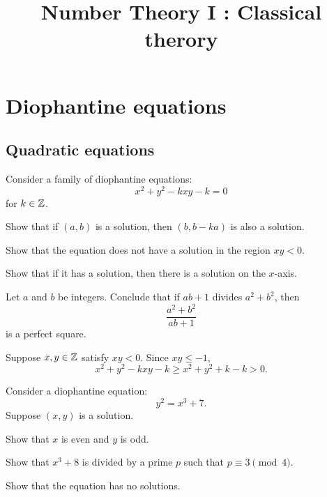 \documentclass{../prb}
\title{Number Theory I : Classical therory}
\begin{document}
\maketitle
\tableofcontents

\chapter{Diophantine equations}

\section{Quadratic equations}


\begin{prb}
Consider a family of diophantine equations:
\[x^2+y^2-kxy-k=0\]
for $k\in\mathbb{Z}$.
\begin{cond}
\item Show that if $(a,b)$ is a solution, then $(b,b-ka)$ is also a solution.
\item Show that the equation does not have a solution in the region $xy<0$.
\item Show that if it has a solution, then there is a solution on the $x$-axis.
\item Let $a$ and $b$ be integers. Conclude that if $ab+1$ divides $a^2+b^2$, then \[\frac{a^2+b^2}{ab+1}\]is a perfect square.
\end{cond}
\end{prb}
\begin{sol}
\item
\item
Suppose $x,y\in\mathbb{Z}$ satisfy $xy<0$.
Since $xy\le-1$,
\[x^2+y^2-kxy-k\ge x^2+y^2+k-k>0.\]
\item
\end{sol}


\begin{prb}
Consider a diophantine equation:
\[y^2=x^3+7.\]
Suppose $(x,y)$ is a solution.
\begin{cond}
\item Show that $x$ is even and $y$ is odd.
\item Show that $x^3+8$ is divided by a prime $p$ such that $p\equiv3\pmod{4}$.
\item Show that the equation has no solutions.
\end{cond}
\end{prb}
\end{document}
